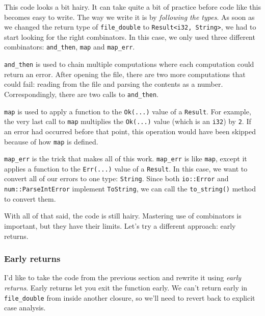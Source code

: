 \documentclass[a4paper,]{book}
\begin{document}
This code looks a bit hairy. It can take quite a bit of practice before
code like this becomes easy to write. The way we write it is by
\emph{following the types}. As soon as we changed the return type of
\texttt{file\_double} to
\texttt{Result\textless{}i32,\ String\textgreater{}}, we had to start
looking for the right combinators. In this case, we only used three
different combinators: \texttt{and\_then}, \texttt{map} and
\texttt{map\_err}.

\texttt{and\_then} is used to chain multiple computations where each
computation could return an error. After opening the file, there are two
more computations that could fail: reading from the file and parsing the
contents as a number. Correspondingly, there are two calls to
\texttt{and\_then}.

\texttt{map} is used to apply a function to the \texttt{Ok(...)} value
of a \texttt{Result}. For example, the very last call to \texttt{map}
multiplies the \texttt{Ok(...)} value (which is an \texttt{i32}) by
\texttt{2}. If an error had occurred before that point, this operation
would have been skipped because of how \texttt{map} is defined.

\texttt{map\_err} is the trick that makes all of this work.
\texttt{map\_err} is like \texttt{map}, except it applies a function to
the \texttt{Err(...)} value of a \texttt{Result}. In this case, we want
to convert all of our errors to one type: \texttt{String}. Since both
\texttt{io::Error} and \texttt{num::ParseIntError} implement
\texttt{ToString}, we can call the \texttt{to\_string()} method to
convert them.

With all of that said, the code is still hairy. Mastering use of
combinators is important, but they have their limits. Let's try a
different approach: early returns.

\subsubsection{Early returns}\label{early-returns-1}

I'd like to take the code from the previous section and rewrite it using
\emph{early returns}. Early returns let you exit the function early. We
can't return early in \texttt{file\_double} from inside another closure,
so we'll need to revert back to explicit case analysis.
\end{document}
